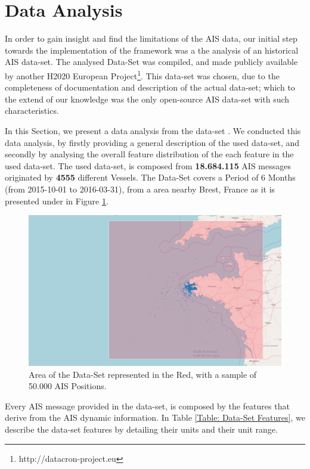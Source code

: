 \section{Data Analysis}
\label{section: Data Analysis}
In order to gain insight and find the limitations of the AIS data, our initial step towards the implementation of the framework was a the analysis of an historical AIS data-set. The analysed Data-Set was compiled, and made publicly available by another H2020 European Project\footnote{http://datacron-project.eu}. 
This data-set was chosen, due to the completeness of documentation and description of the actual data-set; which to the extend of our knowledge was the only open-source AIS data-set with such characteristics.  

In this Section, we present a data analysis from the data-set \cite{DATASET}. We conducted this data analysis, by firstly providing a general description of the used data-set, and secondly by analysing the overall feature distribution of the each feature in the used data-set.
The used data-set, is composed from \textbf{18.684.115} AIS messages originated by \textbf{4555} different Vessels. The Data-Set covers a Period of 6 Months (from 2015-10-01 to 2016-03-31), from a area nearby Brest, France as it is presented under in Figure \ref{fig:DS_Sample}.

\begin{figure}[H]
	\centering
	\includegraphics[scale = .23]{figures/Ch4/nari_DS_ex2.png}
    \caption{Area of the Data-Set represented in the Red, with a sample of 50.000 AIS Positions.}
    \label{fig:DS_Sample}
\end{figure}

Every AIS message provided in the data-set, is composed by the features that derive from the AIS dynamic information. In Table \ref{Table: Data-Set Features}, we describe the data-set features by detailing their units and their unit range. 

